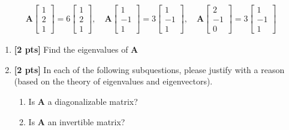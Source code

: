 \documentclass[11pt,addpoints,answers]{exam}
\numberwithin{equation}{section} %
\numberwithin{figure}{section} %
\numberwithin{table}{section} %
\begin{document}
\begin{questions}
    \begin{align*}
    \mathbf{A} \begin{bmatrix}
        1 \\2 \\1
    \end{bmatrix} = 6\begin{bmatrix}
        1 \\ 2 \\1
    \end{bmatrix}, \quad \mathbf{A}\begin{bmatrix}
        1 \\ -1 \\ 1
    \end{bmatrix} = 3 \begin{bmatrix}
        1 \\ -1 \\ 1
    \end{bmatrix}, \quad \mathbf{A} \begin{bmatrix}
        2 \\ -1 \\ 0
    \end{bmatrix} = 3 \begin{bmatrix}
        1 \\ -1 \\ 1
    \end{bmatrix}
    \end{align*}
    \begin{enumerate}[label=\Roman*]
        \item \textbf{[2 pts]} Find the eigenvalues of $\mathbf{A}$
        \item \textbf{[2 pts]} In each of the following subquestions, please justify with a reason (based on the theory of eigenvalues and eigenvectors).
        \begin{enumerate}
            \item Is $\mathbf{A}$ a diagonalizable matrix?
            \item Is $\mathbf{A}$ an invertible matrix?
        \end{enumerate}

    \end{enumerate}
    \begin{tcolorbox}[fit,height=3cm, width=\textwidth, blank, borderline={0.5pt}{-2pt},halign=center, valign=center, nobeforeafter]
    \end{tcolorbox}     
    
\end{questions}
\end{document}
